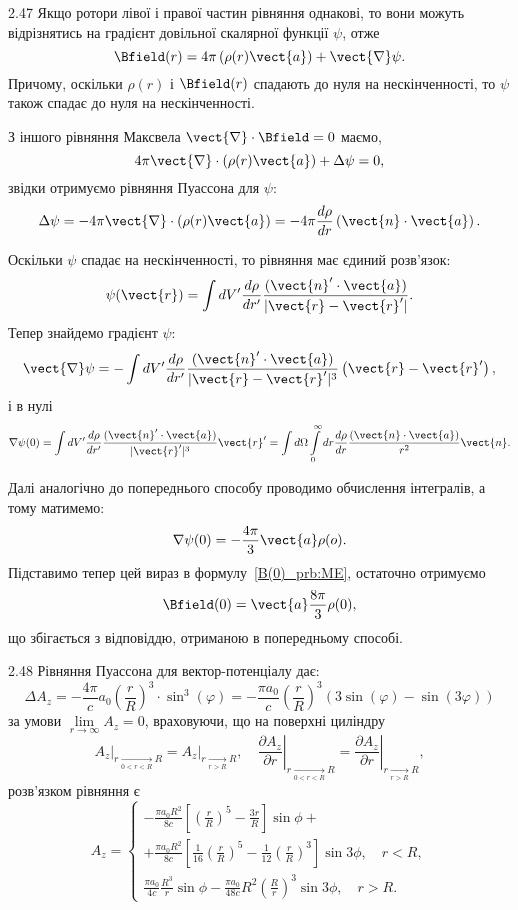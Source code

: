\begin{Solution}{2.{47}}
	Якщо ротори лівої і правої частин рівняння однакові, то вони можуть відрізнятись на градієнт довільної скалярної функції $\psi$, отже
	\begin{equation}\label{B(0)_prb:ME}
		\Bfield(r) = 4\pi \left( \rho(r) \vect{a}\right) + \vect{\nabla}\psi.
	\end{equation}
	Причому, оскільки $\rho(r)$   і $\Bfield(r)$  спадають до нуля на нескінченності,  то $\psi$  також спадає до нуля на нескінченності.

	З іншого рівняння Максвела $\vect{\nabla} \cdot \Bfield = 0$ маємо,
	\[
		4\pi \vect{\nabla} \cdot \left( {\rho (r){\vect{a}}} \right) + \Delta \psi  = 0,
	\]
	звідки отримуємо рівняння Пуассона для $\psi$:
	\[
		\Delta \psi = - 4\pi \vect{\nabla} \cdot \left( {\rho (r){\vect{a}}} \right) = - 4\pi\frac{d\rho}{dr} \left( \vect{n} \cdot \vect{a} \right).
	\]

	Оскільки $\psi$ спадає на нескінченності, то рівняння має єдиний розв'язок:
	\[
		\psi (\vect{r}) = \int dV' \frac{d\rho}{dr'}\frac{(\vect{n}'\cdot \vect{a})}{|\vect{r} - \vect{r}'|}.
	\]
	Тепер знайдемо градієнт $\psi$:
	\[
		\vect{\nabla}\psi = - \int {dV'} \frac{d\rho}{dr'}\frac{(\vect{n}' \cdot \vect{a})}{|\vect{r} - \vect{r}'|^3}\left( {\vect{r} - \vect{r}'} \right),
	\]
	і в нулі
	\[
		\nabla \psi (0) = \int dV' \frac{d\rho}{dr'}\frac{(\vect{n}' \cdot \vect{a})}{|\vect{r}'|^3} \vect{r}'= \int {d\Omega} \int\limits_0^\infty  dr \frac{d\rho}{dr}\frac{(\vect{n} \cdot \vect{a})}{r^2}{\vect{n}}.
	\]

	Далі аналогічно до попереднього способу проводимо обчислення інтегралів, а тому матимемо:
	\[
		\nabla \psi (0) = -\frac{4\pi}{3}\vect{a}\rho(o).
	\]
	Підставимо тепер цей вираз в формулу~\eqref{B(0)_prb:ME}, остаточно отримуємо
	\[
		\Bfield(0) = \vect{a}\frac{8\pi}{3}\rho(0),
	\]
	що збігається з відповіддю, отриманою в попередньому способі.
\end{Solution}
\begin{Solution}{2.{48}}
	Рівняння Пуассона для вектор-потенціалу дає:
	\[\Delta {A_z} =  - \frac{{4\pi }}{c}{a_0}{\left( {\frac{r}{R}} \right)^3} \cdot {\sin ^3}(\varphi ) =  - \frac{{\pi {a_0}}}{c}{\left( {\frac{r}{R}} \right)^3}\left( {3\sin (\varphi ) - \sin (3\varphi )} \right)
	\]
    за умови $\lim\limits_{r\to\infty} A_z = 0$, враховуючи, що на поверхні циліндру
    \[
        \left. A_z\right|_{r \underset{0<r<R}{\to} R} = \left. A_z\right|_{r \underset{r>R}{\to} R}, \quad  \left. \frac{\partial A_z}{\partial r}\right|_{r \underset{0<r<R}{\to} R} = \left. \frac{\partial A_z}{\partial r}\right|_{r \underset{r>R}{\to} R},
    \]
розв'язком рівняння є
	\[
		A_z =
		\begin{cases}
			- \frac{\pi a_0R^2}{8c}\left[ \left( \frac{r}{R} \right)^5 - \frac{3r}{R} \right] \sin\phi  + \\ +  \frac{\pi a_0R^2}{8c}\left[ \frac{1}{16}{\left( \frac{r}{R} \right)^5} - \frac{1}{12} \left( \frac{r}{R} \right)^3 \right]  \sin3\phi, \quad r < R, \\
			\frac{\pi a_0}{4c}\frac{R^3}{r} \sin\phi  - \frac{{\pi {a_0}}}{{48c}}{R^2}{\left( {\frac{R}{r}} \right)^3}  \sin3\phi, \quad r > R.
		\end{cases}
	\]
\end{Solution}
